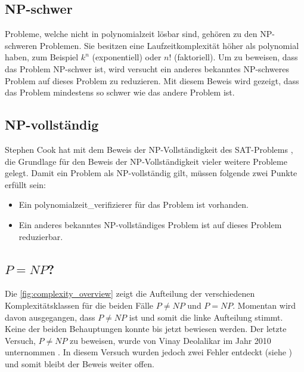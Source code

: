 \subsection{NP-schwer}\label{np_hard}
Probleme, welche nicht in \gls{polynomialzeit} lösbar sind, gehören zu den NP-schweren Problemen. Sie besitzen eine Laufzeitkomplexität höher als polynomial haben, zum Beispiel 
$k^n$ (exponentiell) oder $n!$ (faktoriell). Um zu beweisen, dass das Problem NP-schwer ist, wird versucht ein anderes bekanntes NP-schweres Problem auf dieses Problem zu reduzieren. Mit 
diesem Beweis wird gezeigt, dass das Problem mindestens so schwer wie das andere Problem ist.

\subsection{NP-vollständig}\label{np_complet}
Stephen Cook hat mit dem Beweis der NP-Vollständigkeit des SAT-Problems \cite{cook_complexity}, die Grundlage für den Beweis der NP-Vollständigkeit vieler weitere Probleme 
gelegt. Damit ein Problem als NP-vollständig gilt, müssen folgende zwei Punkte erfüllt sein:
\begin{itemize}
	\item Ein \gls{polynomialzeit_verifizierer} für das Problem ist vorhanden.
	\item Ein anderes bekanntes NP-vollständiges Problem ist auf dieses Problem reduzierbar.
\end{itemize}

\subsection{$P = NP$?}
Die \autoref{fig:complexity_overview} zeigt die Aufteilung der verschiedenen Komplexitätsklassen für die beiden Fälle $P \neq NP$ und $P=NP$. Momentan wird davon ausgegangen, 
dass $P \neq NP$ ist und somit die linke Aufteilung stimmt. Keine der beiden Behauptungen konnte bis jetzt bewiesen werden. Der letzte Versuch, $P \neq NP$ zu beweisen, wurde von 
Vinay Deolalikar im Jahr 2010 unternommen \cite{p_neq_np_paper}. In diesem Versuch wurden jedoch zwei Fehler entdeckt (siehe \cite{p_neq_np_paper_blog}) und somit bleibt der 
Beweis weiter offen.

